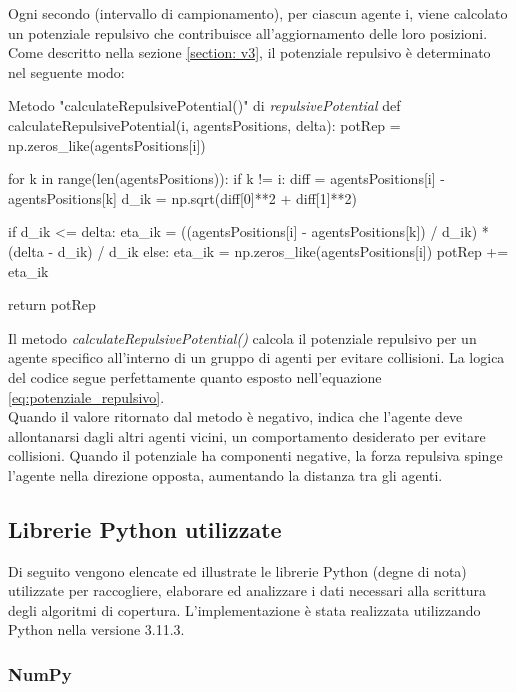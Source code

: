 \documentclass[twoside]{article}
\begin{document}
Ogni secondo (intervallo di campionamento), per ciascun agente i, viene calcolato un potenziale repulsivo che contribuisce all'aggiornamento delle loro posizioni. Come descritto nella sezione \ref{section: v3}, il potenziale repulsivo è determinato nel seguente modo:

\begin{code}{Metodo "calculateRepulsivePotential()" di \textit{repulsivePotential}}
def calculateRepulsivePotential(i, agentsPositions, delta):
    potRep = np.zeros_like(agentsPositions[i])
    
    for k in range(len(agentsPositions)):
        if k != i:
            diff = agentsPositions[i] - agentsPositions[k]
            d_ik = np.sqrt(diff[0]**2 + diff[1]**2)
            
            if d_ik <= delta:
                eta_ik = ((agentsPositions[i] - agentsPositions[k]) / d_ik) * (delta - d_ik) / d_ik
            else:
                eta_ik = np.zeros_like(agentsPositions[i])  
            potRep += eta_ik  
            
    return potRep
\end{code}

Il metodo \textit{calculateRepulsivePotential()} calcola il potenziale repulsivo per un agente specifico all'interno di un gruppo di agenti per evitare collisioni. La logica del codice segue perfettamente quanto esposto nell'equazione \ref{eq:potenziale_repulsivo}.\\
Quando il valore ritornato dal metodo è negativo, indica che l'agente deve allontanarsi dagli altri agenti vicini, un comportamento desiderato per evitare collisioni. Quando il potenziale ha componenti negative, la forza repulsiva spinge l'agente nella direzione opposta, aumentando la distanza tra gli agenti.

\newpage

\subsection{Librerie Python utilizzate}
Di seguito vengono elencate ed illustrate le librerie Python (degne di nota) utilizzate per raccogliere, elaborare ed analizzare i dati necessari alla scrittura degli algoritmi di copertura. L'implementazione è stata realizzata utilizzando Python nella versione 3.11.3.

\subsubsection{NumPy}
\end{document}
